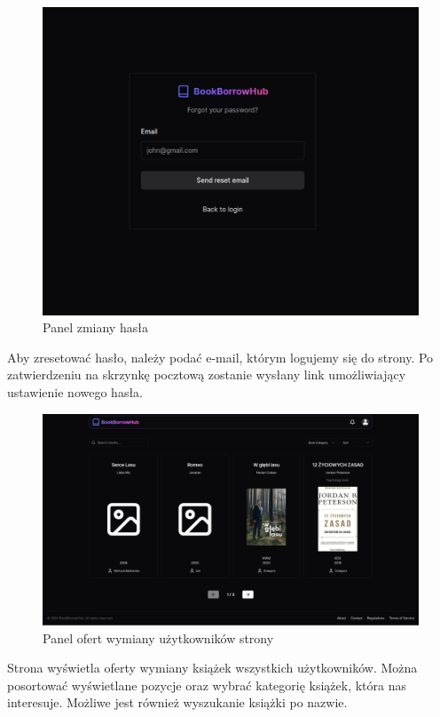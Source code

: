 \documentclass[12pt]{article}
\begin{document}
\newpage
\begin{figure}[h!]
	\centering
	\includegraphics[width=17.5cm]{figures/Obraz11.png}
	\caption{Panel zmiany hasła}
\end{figure}
Aby zresetować hasło, 
należy podać e-mail, którym logujemy się do strony. 
Po zatwierdzeniu na skrzynkę pocztową 
zostanie wysłany link umożliwiający ustawienie nowego hasła.

\newpage
\begin{figure}[h!]
	\centering
	\includegraphics[width=17.5cm]{figures/Obraz12.png}
	\caption{Panel ofert wymiany użytkowników strony}
\end{figure}
Strona wyświetla oferty wymiany książek wszystkich użytkowników. 
Można posortować wyświetlane pozycje oraz wybrać kategorię książek, 
która nas interesuje. Możliwe jest również wyszukanie książki po nazwie.
\end{document}
